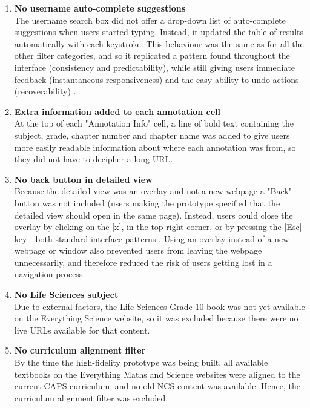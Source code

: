 \begin{enumerate}
\item \textbf{No username auto-complete suggestions}\\
The username search box did not offer a drop-down list of auto-complete suggestions when users started typing. Instead, it updated the table of results automatically with each keystroke. This behaviour was the same as for all the other filter categories, and so it replicated a pattern found throughout the interface (consistency and predictability), while still giving users immediate feedback (instantaneous responsiveness) and the easy ability to undo actions (recoverability) \citep[p. 272]{DixFinlay}. 

\item \textbf{Extra information added to each annotation cell}\\
At the top of each "Annotation Info" cell, a line of bold text containing the subject, grade, chapter number and chapter name was added to give users more  easily readable information about where each annotation was from, so they did not have to decipher a long URL.

\item \textbf{No back button in detailed view}\\
Because the detailed view was an overlay and not a new webpage a "Back" button was not included (users making the prototype specified that the detailed view should open in the same page). Instead, users could close the overlay by clicking on the [x], in the top right corner, or by pressing the [Esc] key - both standard interface patterns \citep[p. 345]{Galitz}. Using an overlay instead of a new webpage or window also prevented users from leaving the webpage unnecessarily, and therefore reduced the risk of users getting lost in a navigation process. 

\item \textbf{No Life Sciences subject}\\
Due to external factors, the Life Sciences Grade 10 book was not yet available on the Everything Science website, so it was excluded because there were no live URLs available for that content. 

\item \textbf{No curriculum alignment filter}\\
By the time the high-fidelity prototype was being built, all available textbooks on the Everything Maths and Science websites were aligned to the current CAPS curriculum, and no old NCS content was available. Hence, the curriculum alignment filter was excluded. 


\end{enumerate}
